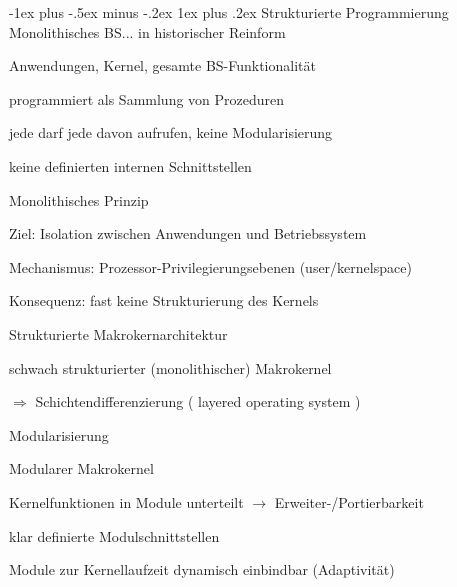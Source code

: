 \documentclass[a4paper]{article}
\makeatletter
\renewcommand{\subsubsection}{\@startsection{subsubsection}{3}{0mm}%
 {-1ex plus -.5ex minus -.2ex}%
 {1ex plus .2ex}%
 {\normalfont\small\bfseries}}
\makeatother
\begin{document}
\begin{multicols}{3}
    \subsubsection{Strukturierte Programmierung}
    Monolithisches BS... in historischer Reinform
    \begin{itemize*}
        \item Anwendungen, Kernel, gesamte BS-Funktionalität
        \item programmiert als Sammlung von Prozeduren
        \item jede darf jede davon aufrufen, keine Modularisierung
        \item keine definierten internen Schnittstellen
    \end{itemize*}

    Monolithisches Prinzip
    \begin{itemize*}
        \item Ziel: Isolation zwischen Anwendungen und Betriebssystem
        \item Mechanismus: Prozessor-Privilegierungsebenen (user/kernelspace)
        \item Konsequenz: fast keine Strukturierung des Kernels
    \end{itemize*}

    Strukturierte Makrokernarchitektur
    \begin{itemize*}
        \item schwach strukturierter (monolithischer) Makrokernel
        \item[$\Rightarrow$] Schichtendifferenzierung ( layered operating system )
        \item Modularisierung
    \end{itemize*}
    
    Modularer Makrokernel
    \begin{itemize*}
        \item Kernelfunktionen in Module unterteilt $\rightarrow$ Erweiter-/Portierbarkeit
        \item klar definierte Modulschnittstellen
        \item Module zur Kernellaufzeit dynamisch einbindbar (Adaptivität)
    \end{itemize*}


\end{multicols}
\end{document}
